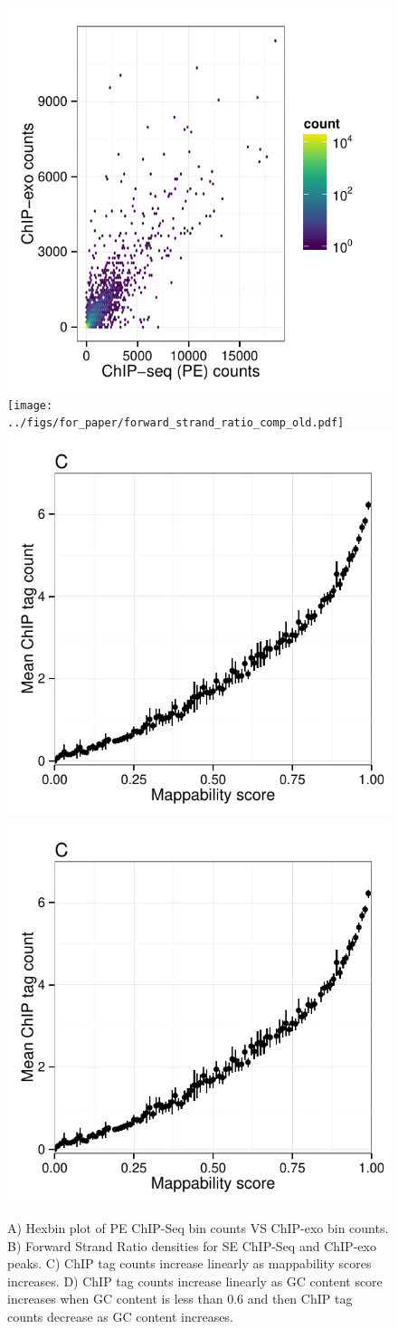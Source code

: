 \documentclass[11pt]{article}\usepackage[]{graphicx}\usepackage[]{color}
\begin{document}
\begin{figure}[H]
  \centering
  \includegraphics[width = .46\textwidth,page = 3 ]{../figs/for_paper/ChIPseqPET_ChIPexo_tagCount_comparison.pdf}
  \texttt{[image: ../figs/for\_paper/forward\_strand\_ratio\_comp\_old.pdf]}
\includegraphics[width = .46\textwidth,page = 1]{../figs/for_paper/eukaryotic_bias_CTCF.pdf}
  \includegraphics[width = .46\textwidth,page = 2]{../figs/for_paper/eukaryotic_bias_CTCF.pdf}
  \caption{ A) Hexbin plot of PE ChIP-Seq bin counts VS ChIP-exo bin
    counts. B) Forward Strand Ratio densities for SE ChIP-Seq and
    ChIP-exo peaks. C) ChIP tag counts increase linearly as
    mappability scores increases. D) ChIP tag counts increase linearly
    as GC content score increases when GC content is less than 0.6 and
    then ChIP tag counts decrease as GC content increases. }
  \label{fig:comp}
\end{figure}
\end{document}
